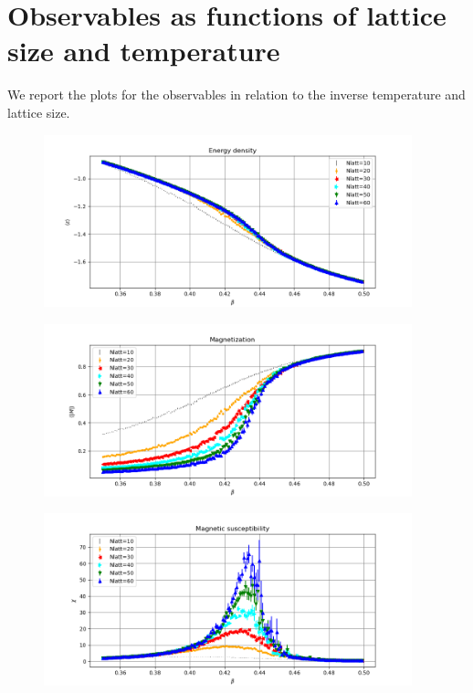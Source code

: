 \documentclass[11pt]{scrartcl} %
\begin{document}
\section{Observables as functions of lattice size and temperature}
\label{plots}
We report the plots for the observables in relation to the inverse temperature and lattice size.
\begin{figure}
	\centering
	\includegraphics[width=0.95\textwidth]{figures/energy_density.png}
\end{figure}
\begin{figure}
	\centering
	\includegraphics[width=0.95\textwidth]{figures/magnetization_density.png}
\end{figure}
\begin{figure}
	\centering
	\includegraphics[width=0.95\textwidth]{figures/magnetic_susceptibility.png}
\end{figure}
\end{document}
